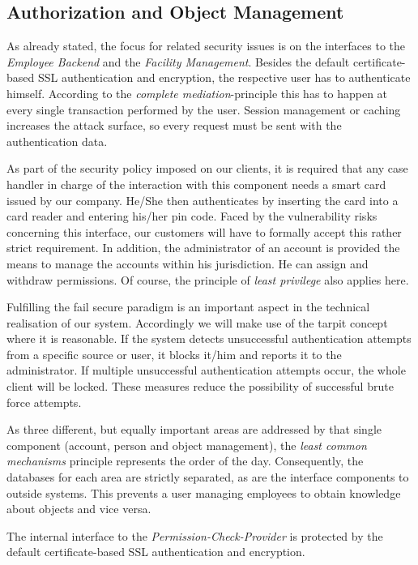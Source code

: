 \documentclass[12pt,a4paper,titlepage,oneside]{scrartcl}
\begin{document}
\subsection{Authorization and Object Management}
As already stated, the focus for related security issues is on the interfaces to the \emph{Employee Backend} and the \emph{Facility Management}. Besides the default certificate-based SSL authentication and encryption, the respective user has to authenticate himself. According to the \emph{complete mediation}-principle this has to happen at every single transaction performed by the user. Session management or caching increases the attack surface, so every request must be sent with the authentication data.

As part of the security policy imposed on our clients, it is required that any case handler in charge of the interaction with this component needs a smart card issued by our company. He/She then authenticates by inserting the card into a card reader and entering his/her pin code. Faced by the vulnerability risks concerning this interface, our customers will have to formally accept this rather strict requirement. In addition, the administrator of an account is provided the means to manage the accounts within his jurisdiction. He can assign and withdraw permissions. Of course, the principle of \emph{least privilege} also applies here.

Fulfilling the fail secure paradigm is an important aspect in the technical realisation of our system. Accordingly we will make use of the tarpit concept where it is reasonable. If the system detects unsuccessful authentication attempts from a specific source or user, it blocks it/him and reports it to the administrator. If multiple unsuccessful authentication attempts occur, the whole client will be locked. These measures reduce the possibility of successful brute force attempts.

As three different, but equally important areas are addressed by that single component (account, person and object management), the \emph{least common mechanisms} principle represents the order of the day. Consequently, the databases for each area are strictly separated, as are the interface components to outside systems. This prevents a user managing employees to obtain knowledge about objects and vice versa.

The internal interface to the \emph{Permission-Check-Provider} is protected by the default certificate-based SSL authentication and encryption.
\end{document}
